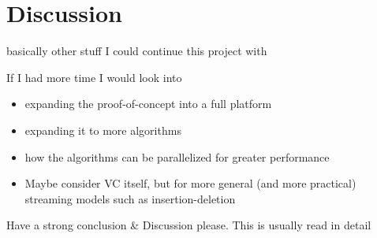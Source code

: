 \section{Discussion}

basically other stuff I could continue this project with

If I had more time I would look into

\begin{itemize}
    \item
          expanding the proof-of-concept into a full platform
    \item
          expanding it to more algorithms
    \item
          how the algorithms can be parallelized for greater performance
    \item
          Maybe consider VC itself, but for more general (and more practical)
          streaming models such as insertion-deletion
\end{itemize}

Have a strong conclusion & Discussion please. This is usually read in detail
